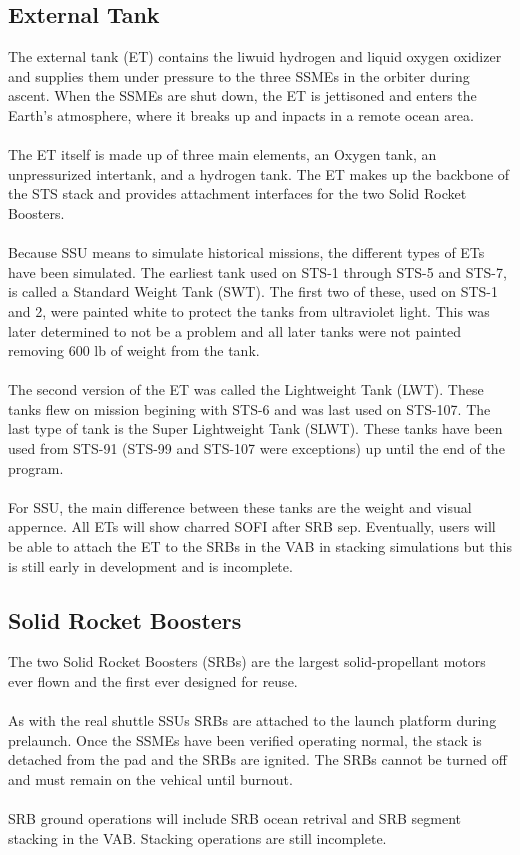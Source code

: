 \documentclass[13pt]{article}
\begin{document}
\begin{multicols}{2}
\subsection{\large External Tank}
The external tank (ET) contains the liwuid hydrogen and liquid oxygen oxidizer and supplies them under pressure to the three SSMEs in the orbiter during ascent. When the SSMEs are shut down, the ET is jettisoned and enters the Earth's atmosphere, where it breaks up and inpacts in a remote ocean area.\\
\\
The ET itself is made up of three main elements, an Oxygen tank, an unpressurized intertank, and a hydrogen tank.  The ET makes up the backbone of the STS stack and provides attachment interfaces for the two Solid Rocket Boosters.\\
\\
Because SSU means to simulate historical missions, the different types of ETs have been simulated. The earliest tank used on STS-1 through STS-5 and STS-7, is called a Standard Weight Tank (SWT). The first two of these, used on STS-1 and 2, were painted white to protect the tanks from ultraviolet light.  This was later determined to not be a problem and all later tanks were not painted removing 600 lb of weight from the tank.\\
\\
The second version of the ET was called the Lightweight Tank (LWT).  These tanks flew on mission begining with STS-6 and was last used on STS-107.  The last type of tank is the Super Lightweight Tank (SLWT).  These tanks have been used from STS-91 (STS-99 and STS-107 were exceptions) up until the end of the program.\\
\\
For SSU, the main difference between these tanks are the weight and visual appernce.  All ETs will show charred SOFI after SRB sep. Eventually, users will be able to attach the ET to the SRBs in the VAB in stacking simulations but this is still early in development and is incomplete.\\
\subsection{\large Solid Rocket Boosters}
The two Solid Rocket Boosters (SRBs) are the largest solid-propellant motors ever flown and the first ever designed for reuse.\\
\\
As with the real shuttle SSUs SRBs are attached to the launch platform during prelaunch.  Once the SSMEs have been verified operating normal, the stack is detached from the pad and the SRBs are ignited. The SRBs cannot be turned off and must remain on the vehical until burnout.\\
\\
SRB ground operations will include SRB ocean retrival and SRB segment stacking in the VAB. Stacking operations are still incomplete.

\end{multicols}
\end{document}
